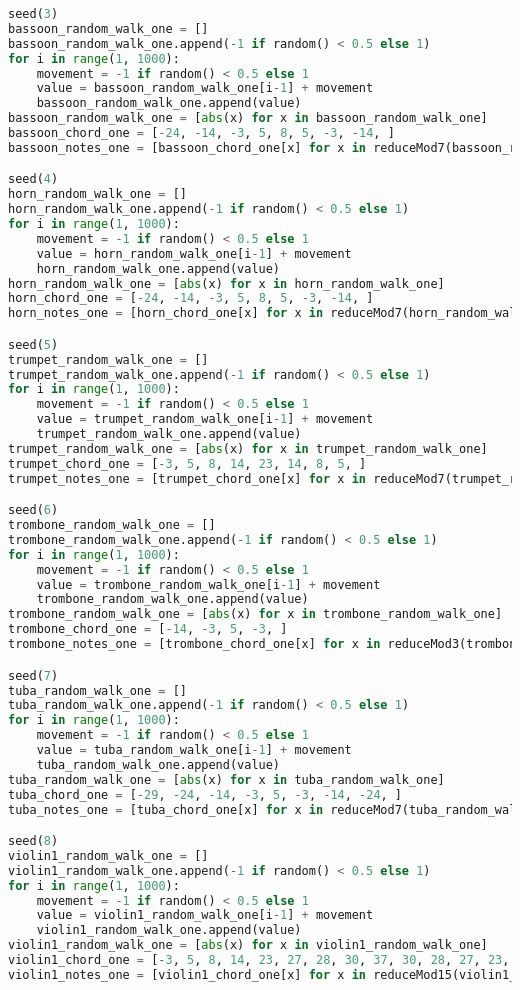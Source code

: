 \begin{lstlisting}[language=Python, caption=Tianshu Segment\_I]
seed(3)
bassoon_random_walk_one = []
bassoon_random_walk_one.append(-1 if random() < 0.5 else 1)
for i in range(1, 1000):
    movement = -1 if random() < 0.5 else 1
    value = bassoon_random_walk_one[i-1] + movement
    bassoon_random_walk_one.append(value)
bassoon_random_walk_one = [abs(x) for x in bassoon_random_walk_one]
bassoon_chord_one = [-24, -14, -3, 5, 8, 5, -3, -14, ]
bassoon_notes_one = [bassoon_chord_one[x] for x in reduceMod7(bassoon_random_walk_one)]

seed(4)
horn_random_walk_one = []
horn_random_walk_one.append(-1 if random() < 0.5 else 1)
for i in range(1, 1000):
    movement = -1 if random() < 0.5 else 1
    value = horn_random_walk_one[i-1] + movement
    horn_random_walk_one.append(value)
horn_random_walk_one = [abs(x) for x in horn_random_walk_one]
horn_chord_one = [-24, -14, -3, 5, 8, 5, -3, -14, ]
horn_notes_one = [horn_chord_one[x] for x in reduceMod7(horn_random_walk_one)]

seed(5)
trumpet_random_walk_one = []
trumpet_random_walk_one.append(-1 if random() < 0.5 else 1)
for i in range(1, 1000):
    movement = -1 if random() < 0.5 else 1
    value = trumpet_random_walk_one[i-1] + movement
    trumpet_random_walk_one.append(value)
trumpet_random_walk_one = [abs(x) for x in trumpet_random_walk_one]
trumpet_chord_one = [-3, 5, 8, 14, 23, 14, 8, 5, ]
trumpet_notes_one = [trumpet_chord_one[x] for x in reduceMod7(trumpet_random_walk_one)]

seed(6)
trombone_random_walk_one = []
trombone_random_walk_one.append(-1 if random() < 0.5 else 1)
for i in range(1, 1000):
    movement = -1 if random() < 0.5 else 1
    value = trombone_random_walk_one[i-1] + movement
    trombone_random_walk_one.append(value)
trombone_random_walk_one = [abs(x) for x in trombone_random_walk_one]
trombone_chord_one = [-14, -3, 5, -3, ]
trombone_notes_one = [trombone_chord_one[x] for x in reduceMod3(trombone_random_walk_one)]

seed(7)
tuba_random_walk_one = []
tuba_random_walk_one.append(-1 if random() < 0.5 else 1)
for i in range(1, 1000):
    movement = -1 if random() < 0.5 else 1
    value = tuba_random_walk_one[i-1] + movement
    tuba_random_walk_one.append(value)
tuba_random_walk_one = [abs(x) for x in tuba_random_walk_one]
tuba_chord_one = [-29, -24, -14, -3, 5, -3, -14, -24, ]
tuba_notes_one = [tuba_chord_one[x] for x in reduceMod7(tuba_random_walk_one)]

seed(8)
violin1_random_walk_one = []
violin1_random_walk_one.append(-1 if random() < 0.5 else 1)
for i in range(1, 1000):
    movement = -1 if random() < 0.5 else 1
    value = violin1_random_walk_one[i-1] + movement
    violin1_random_walk_one.append(value)
violin1_random_walk_one = [abs(x) for x in violin1_random_walk_one]
violin1_chord_one = [-3, 5, 8, 14, 23, 27, 28, 30, 37, 30, 28, 27, 23, 14, 8, 5, ]
violin1_notes_one = [violin1_chord_one[x] for x in reduceMod15(violin1_random_walk_one)]


\end{lstlisting}
